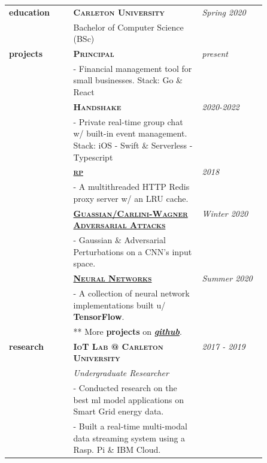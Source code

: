 \documentclass[9pt]{article}
\begin{document}
\begin{longtable}{@{}>{\raggedleft}p{0.25\linewidth}
                          p{}>{}p{0.25\linewidth}@{}}
        \textbf{education}
            & \textbf{\textsc{Carleton University}} & \textit{Spring 2020} \\
            & Bachelor of Computer Science (BSc) \\ [1em]

        \textbf{projects}
            & \textbf{\textsc{Principal} } & \textit{present} \\
            & - Financial management tool for small businesses. Stack: Go \& React\\ [0.5em]

            & \textbf{\textsc{Handshake} } & \textit{2020-2022} \\
            & - Private real-time group chat w/ built-in event management. Stack: iOS - Swift \& Serverless - Typescript \\ [0.5em]

            & \textbf{\textsc{\href{https://github.com/boshd/rp}{\textbf{rp}}}} & \textit{2018} \\
            & - A multithreaded HTTP Redis proxy server w/ an LRU cache. \\ [0.5em]

            & \textbf{\textsc{\href{https://github.com/boshd/advatck}{\textbf{Guassian/Carlini-Wagner Adversarial Attacks}}}}\ & \textit{Winter 2020} \\
            & - Gaussian \& Adversarial Perturbations on a CNN's input space. \\ [0.5em]

            & \textbf{\textsc{\href{https://github.com/boshd/neuralnets}{\textbf{Neural Networks}}}} & \textit{Summer 2020} \\
            & - A collection of neural network implementations built u/ \textbf{TensorFlow}. \\ [0.5em]

            & ** More \textbf{projects} on \textit{\href{https://github.com/boshd}{\textbf{github}}}.\\ [1em]

                \textbf{research}
            & \textbf{\textsc{IoT Lab @ Carleton University}} & \textit{2017 - 2019} \\
            & \textit{Undergraduate Researcher} \\
            & - Conducted research on the best ml model applications on Smart Grid energy data. \\
            & - Built a real-time multi-modal data streaming system using a Rasp. Pi \& IBM Cloud. \\ [0.5em]


\end{longtable}
\end{document}
